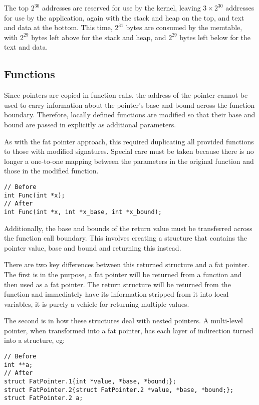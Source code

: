The top $2^{30}$ addresses are reserved for use by the kernel, leaving $3 \times 2^{30}$ addresses for use by the application, again with the stack and heap on the top, and text and data at the bottom.
This time, $2^{31}$ bytes are consumed by the memtable, with $2^{29}$ bytes left above for the stack and heap, and $2^{29}$ bytes left below for the text and data.
\subsection{Functions}

Since pointers are copied in function calls, the address of the pointer cannot be used to carry information about the pointer's base and bound across the function boundary.
Therefore, locally defined functions are modified so that their base and bound are passed in explicitly as additional parameters.

As with the fat pointer approach, this required duplicating all provided functions to those with modified signatures.
Special care must be taken because there is no longer a one-to-one mapping between the parameters in the original function and those in the modified function.

\begin{verbatim}
// Before
int Func(int *x);
// After
int Func(int *x, int *x_base, int *x_bound);
\end{verbatim}

Additionally, the base and bounds of the return value must be transferred across the function call boundary.
This involves creating a structure that contains the pointer value, base and bound and returning this instead.

There are two key differences between this returned structure and a fat pointer.
The first is in the purpose, a fat pointer will be returned from a function and then used as a fat pointer.
The return structure will be returned from the function and immediately have its information stripped from it into local variables, it is purely a vehicle for returning multiple values.

The second is in how these structures deal with nested pointers.
A multi-level pointer, when transformed into a fat pointer, has each layer of indirection turned into a structure, eg:

\begin{verbatim}
// Before
int **a;
// After
struct FatPointer.1{int *value, *base, *bound;};
struct FatPointer.2{struct FatPointer.2 *value, *base, *bound;};
struct FatPointer.2 a;
\end{verbatim}


